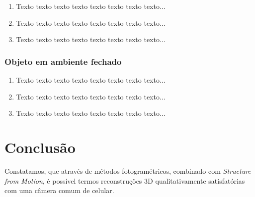 \documentclass[table, usenames, svgnames, xcolor=dvipsnames]{beamer}
\begin{document}
\begin{frame}
	\begin{enumerate}
    	\item Texto texto texto texto texto texto texto texto...
		\\[0.5em]

    	\item Texto texto texto texto texto texto texto texto...
		\\[0.5em]
    	
		\item Texto texto texto texto texto texto texto texto...
		\\[0.5em]
	\end{enumerate}
\end{frame}


\subsubsection{Objeto em ambiente fechado}

\begin{frame}
	\begin{enumerate}
    	\item Texto texto texto texto texto texto texto texto...
		\\[0.5em]

    	\item Texto texto texto texto texto texto texto texto...
		\\[0.5em]
    	
		\item Texto texto texto texto texto texto texto texto...
		\\[0.5em]
	\end{enumerate}
\end{frame}


\section{Conclusão}

\begin{frame}
	\begin{center}
	Constatamos, que através de métodos fotogramétricos, combinado com \emph{Structure from Motion}, é possível termos reconstruções 3D qualitativamente satisfatórias com uma câmera comum de celular.
	\end{center}

\end{frame}
\end{document}
